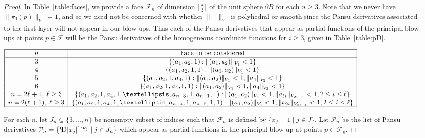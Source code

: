 \documentclass{article}
\theoremstyle{definition}
\newcommand{\norm}[1]{\|#1\|}
\newcommand{\pD}{\text{\scalebox{-1}[1]{$\mathrm{P}$}\!\!$\mathrm{D}$}}
\newcommand{\cF}{{\mathcal F}}
\newcommand{\cP}{{\mathcal P}}
\begin{document}
\begin{proof}

In Table~\ref{table:faces}, we provide a face $\cF_n$ of dimension $\lceil \frac{n}{2}\rceil$ of the unit sphere $\partial B$ for each $n \geq 3$. Note that we never have $\norm{\pi_1(p)}_{V_1} = 1$, and so we need not be concerned with whether $\norm{\cdot}_{V_1}$ is polyhedral or smooth since the Pansu derivatives associated to the first layer will not appear in our blow-ups. Thus each of the Pansu derivatives that appear as partial functions of the principal blow-ups at points $p \in \cF$ will be the Pansu derivatives of the homogeneous coordinate functions for $i \geq 3$, given in Table~\ref{table:pD}.

\begin{table}[H]
\centering
$
\begin{array}{|c|c|}
\hline
n & \text{Face to be considered}\\
\hline
3 & \{(a_1,a_2, 1): \norm{(a_1,a_2)}_{V_1}< 1\}\\
4 & \{(a_1, a_2, 1, 1): \norm{(a_1,a_2)}_{V_1}< 1\}\\
5  & \{(a_1, a_2, 1, a_4, 1): \norm{(a_1,a_2)}_{V_1}< 1, \norm{a_4}_{V_3} < 1\}\\
6 & \{(a_1, a_2, 1, a_4, 1, 1): \norm{(a_1,a_2)}_{V_1}< 1, \norm{a_4}_{V_3} < 1\}\\
n = 2\ell +1 , \: \ell\geq 3 &  \{(a_1, a_2, 1, a_4, 1, \ldots, a_{n-3}, 1, a_{n-1},1): \norm{(a_1,a_2)}_{V_1}< 1, \norm{a_{2i}}_{V_{2i-1}} < 1, 2 \leq i \leq \ell\}\\
n = 2(\ell+1), \: \ell\geq 3 & \{(a_1, a_2, 1, a_4, 1, \ldots, a_{n-4}, 1, a_{n-2},1,1): \norm{(a_1,a_2)}_{V_1}< 1, \norm{a_{2i}}_{V_{2i-1}} < 1, 2 \leq i \leq \ell\}\\
\hline
\end{array}$
\caption{A face of the unit metric sphere in $L_n$ which gives an $(n-1)$-dimensional family of blow-ups.}
\label{table:faces}
\end{table}

For each $n$, let $J_n \subseteq \{3,\ldots, n\}$ be nonempty subset of indices such that $\cF_n$ is defined by $\{x_j = 1 \mid j \in J\}$. Let $\cP_n$ be the list of Pansu derivatives $\cP_n = \{\pD |x_j|^{1/\nu_j} \mid j\in J_n\}$ which appear as partial functions in the principal blow-up at points $p \in \cF_n$.


\end{proof}
\end{document}
